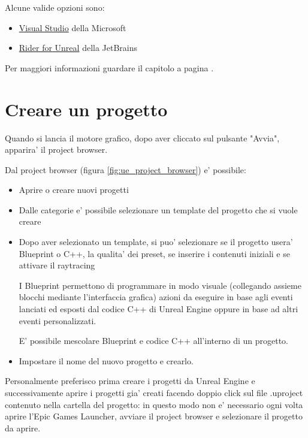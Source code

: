         Alcune valide opzioni sono:
        \begin{itemize}
            \item \href{https://visualstudio.microsoft.com/}{Visual Studio} della Microsoft
            \item \href{https://www.jetbrains.com/lp/rider-unreal/}{Rider for Unreal} della JetBrains
        \end{itemize}

        Per maggiori informazioni guardare il capitolo  a pagina \pageref{chapter:cpp}.


    \section{Creare un progetto}
        Quando si lancia il motore grafico, dopo aver cliccato sul pulsante "Avvia", apparira' il project browser.

        Dal project browser (figura \ref{fig:ue_project_browser}) e' possibile:
        \begin{itemize}
            \item Aprire o creare nuovi progetti
            \item Dalle categorie e' possibile selezionare un template del progetto che si vuole creare
            \item Dopo aver selezionato un template, si puo' selezionare se il progetto usera' Blueprint o C++, la qualita' dei preset, se inserire i contenuti iniziali e se attivare il raytracing

                \begin{notebox}
                    I Blueprint permettono di programmare in modo visuale (collegando assieme blocchi mediante l'interfaccia grafica) azioni
                    da eseguire in base agli eventi lanciati ed esposti dal codice C++ di Unreal Engine oppure in base ad altri eventi personalizzati.

                    E' possibile mescolare Blueprint e codice C++ all'interno di un progetto.
                \end{notebox}

            \item Impostare il nome del nuovo progetto e crearlo.
        \end{itemize}

        \begin{suggestionbox}
            Personalmente preferisco prima creare i progetti da Unreal Engine e successivamente aprire i progetti
            gia' creati facendo doppio click sul file .uproject contenuto nella cartella del progetto:
            in questo modo non e' necessario ogni volta aprire l'Epic Games Launcher, avviare il project browser e selezionare il progetto da aprire.
        \end{suggestionbox}


